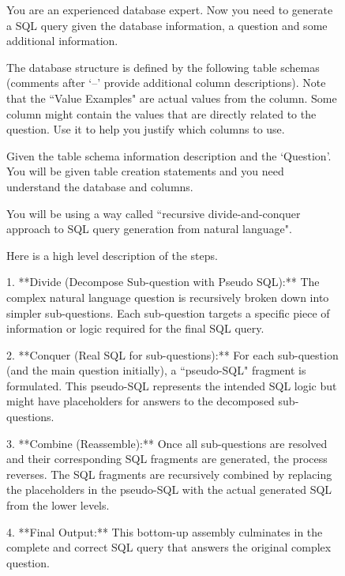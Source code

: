 \clearpage
\newpage

\begin{figure}[t!]
    \centering
    \begin{tcolorbox}[
        title=SQL Generation Action Prompt,
        colback=white,        %
        colframe=blue!75!black,  %
        fonttitle=\bfseries,    %
break at=2cm,       %
    pad at break=1mm,   %
    break at=2cm,       %
    ]

You are an experienced database expert.
Now you need to generate a SQL query given the database information, a question and some additional information.

The database structure is defined by the following table schemas (comments after `--' provide additional column descriptions).
Note that the ``Value Examples" are actual values from the column. Some column might contain the values that are directly related to the question. Use it to help you justify which columns to use.

Given the table schema information description and the `Question'. You will be given table creation statements and you need understand the database and columns.

You will be using a way called ``recursive divide-and-conquer approach to SQL query generation from natural language".

Here is a high level description of the steps.

1. **Divide (Decompose Sub-question with Pseudo SQL):** The complex natural language question is recursively broken down into simpler sub-questions. Each sub-question targets a specific piece of information or logic required for the final SQL query. 

2. **Conquer (Real SQL for sub-questions):**  For each sub-question (and the main question initially), a ``pseudo-SQL" fragment is formulated. This pseudo-SQL represents the intended SQL logic but might have placeholders for answers to the decomposed sub-questions. 

3. **Combine (Reassemble):** Once all sub-questions are resolved and their corresponding SQL fragments are generated, the process reverses. The SQL fragments are recursively combined by replacing the placeholders in the pseudo-SQL with the actual generated SQL from the lower levels.

4. **Final Output:** This bottom-up assembly culminates in the complete and correct SQL query that answers the original complex question.


\end{tcolorbox}
\end{figure}
